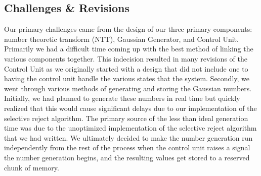 \documentclass{article}
\begin{document}
\subsection{Challenges \& Revisions }
Our primary challenges came from the design of our three primary components: number theoretic transform (NTT), Gaussian Generator, and Control Unit. Primarily we had a difficult time coming up with the best method of linking the various components together. This indecision resulted in many revisions of the Control Unit as we originally started with a design that did not include one to having the control unit handle the various states that the system. Secondly, we went through various methods of generating and storing the Gaussian numbers. Initially, we had planned to generate these numbers in real time but quickly realized that this would cause significant delays due to our implementation of the selective reject algorithm. The primary source of the less than ideal generation time was due to the unoptimized implementation of the selective reject algorithm that we had written. We ultimately decided to make the number generation run independently from the rest of the process when the control unit raises a signal the number generation begins, and the resulting values get stored to a reserved chunk of memory.
\end{document}
